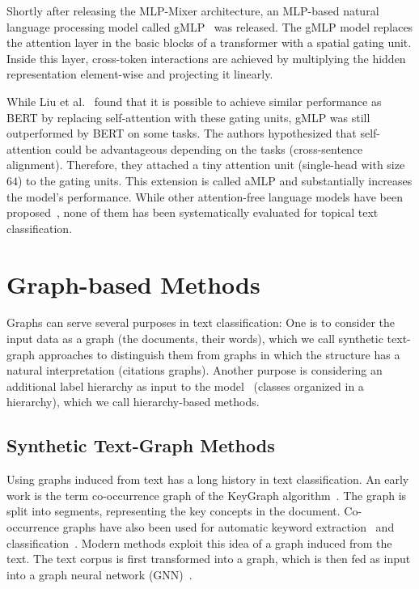 Shortly after releasing the MLP-Mixer architecture, an MLP-based natural language processing model called gMLP~\cite{DBLP:journals/corr/abs-2105-08050} was released. 
The gMLP model replaces the attention layer in the basic blocks of a transformer with a spatial gating unit. 
Inside this layer, cross-token interactions are achieved by multiplying the hidden representation element-wise and projecting it linearly. 

While Liu et al.~\cite{DBLP:journals/corr/abs-2105-08050} found that it is possible to achieve similar performance as BERT by replacing self-attention with these gating units, gMLP was still outperformed by BERT on some tasks.
The authors hypothesized that self-attention could be advantageous depending on the tasks (\ie cross-sentence alignment).
Therefore, they attached a tiny attention unit (single-head with size $64$) to the gating units. 
This extension is called aMLP and substantially increases the model's performance.
While other attention-free language models have been proposed~\cite{pengRWKVReinventingRNNs2023a,guMambaLinearTimeSequence2023b}, none of them has been systematically evaluated for topical text classification.

\section{Graph-based Methods}\label{sec:graph}

Graphs can serve several purposes in text classification: One is to consider the input data as a graph (\ie the documents, their words), which we call synthetic text-graph approaches to distinguish them from graphs in which the structure has a natural interpretation (\eg citations graphs). Another purpose is considering an additional label hierarchy as input to the model~\cite{DBLP:journals/csur/Sebastiani02} (\ie classes organized in a hierarchy), which we call hierarchy-based methods.

\subsection{Synthetic Text-Graph Methods}

Using graphs induced from text has a long history in text classification. 
An early work is the term co-occurrence graph of the KeyGraph algorithm~\cite{DBLP:conf/adl/OhsawaBY98}.
The graph is split into segments, representing the key concepts in the document.
Co-occurrence graphs have also been used for automatic keyword extraction~\cite{Rose2010} and classification~\cite{DBLP:conf/emnlp/ZhangDXLZ21}.
Modern methods exploit this idea of a graph induced from the text.
The text corpus is first transformed into a graph, which is then fed as input into a graph neural network (GNN)~\cite{book:hamilton:grl}.

